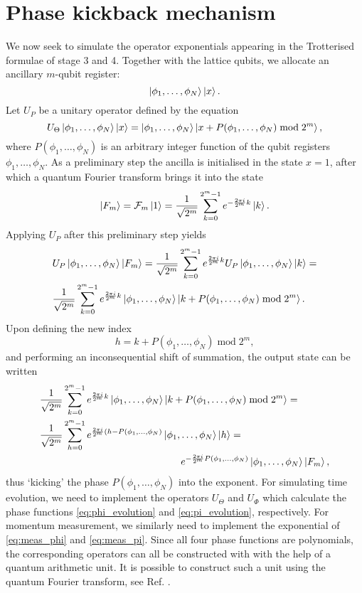 \documentclass[a4paper,10pt]{report}
\begin{document}
\section{Phase kickback mechanism}
We now seek to simulate the operator exponentials appearing in the Trotterised formulae of stage 3 and 4. Together with the lattice qubits, we allocate an ancillary $m$-qubit register:
\begin{equation}
    \ket{\phi_1,\dots,\phi_N}\ket{x}.
\end{equation}
Let $U_P$ be a unitary operator defined by the equation
\begin{equation}
    U_\Theta\ket{\phi_1,\dots,\phi_N}\ket{x} = \ket{\phi_1,\dots,\phi_N}\ket{x + P(\phi_1,\dots,\phi_N)\;\mathrm{mod}\;2^m},
    \label{eq:phi_phase_implementation}
\end{equation}
where $P(\phi_1,\dots,\phi_N)$ is an arbitrary integer function of the qubit registers $\phi_1,\dots,\phi_N$. As a preliminary step the ancilla is initialised in the state $x=1$, after which a quantum Fourier transform brings it into the state
\begin{equation}
\ket{F_m} = \mathcal{F}_m\ket{1} = \frac{1}{\sqrt{2^m}}\sum_{k=0}^{2^m-1}e^{-\frac{2\pi i}{2^m}k}\ket{k}.
\end{equation}
Applying $U_P$ after this preliminary step yields
\begin{align}
&U_P\ket{\phi_1,\dots,\phi_N}\ket{F_m} = \frac{1}{\sqrt{2^m}}\sum_{k=0}^{2^m-1}e^{\frac{2\pi i}{2^m}k}U_P\ket{\phi_1,\dots,\phi_N}\ket{k} = \nonumber\\
&\frac{1}{\sqrt{2^m}}\sum_{k=0}^{2^m-1}e^{\frac{2\pi i}{2^m}k}\ket{\phi_1,\dots,\phi_N}\ket{k + P(\phi_1,\dots,\phi_N)\;\mathrm{mod}\;2^m}.
\end{align}
Upon defining the new index
\begin{equation}
h = k + P(\phi_1,\dots,\phi_N)\;\mathrm{mod}\;2^m,
\end{equation}
and performing an inconsequential shift of summation, the output state can be written
\begin{align}
&\frac{1}{\sqrt{2^m}}\sum_{k=0}^{2^m-1}e^{\frac{2\pi i}{2^m}k}\ket{\phi_1,\dots,\phi_N}\ket{k + P(\phi_1,\dots,\phi_N)\;\mathrm{mod}\;2^m} = \nonumber\\
&\frac{1}{\sqrt{2^m}}\sum_{h=0}^{2^m-1}e^{\frac{2\pi i}{2^m}(h- P(\phi_1,\dots,\phi_N)}\ket{\phi_1,\dots,\phi_N}\ket{h} = \nonumber\\
&\hspace{5cm}e^{-\frac{2\pi i}{2^m}P(\phi_1,\dots,\phi_N)}\ket{\phi_1,\dots,\phi_N}\ket{F_m},
\end{align}
thus `kicking' the phase $P(\phi_1,\dots,\phi_N)$ into the exponent. For simulating time evolution, we need to implement the operators $U_\Theta$ and $U_\Phi$ which calculate the phase functions \eqref{eq:phi_evolution} and \eqref{eq:pi_evolution}, respectively. For momentum measurement, we similarly need to implement the exponential of \eqref{eq:meas_phi} and \eqref{eq:meas_pi}. Since all four phase functions are polynomials, the corresponding operators can all be constructed with with the help of a quantum arithmetic unit. It is possible to construct such a unit using the quantum Fourier transform, see Ref. \cite{perez17}.
\end{document}
